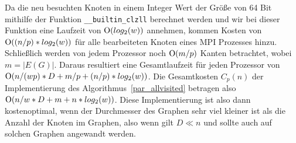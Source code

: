 \documentclass[11pt,a4paper]{article}
\begin{document}
Da die neu besuchten Knoten in einem Integer Wert der Größe von 64 Bit mithilfe der Funktion \lstinline{__builtin_clzll} berechnet werden und wir bei dieser Funktion eine Laufzeit von \($O$(log_{2}(w))\) annehmen, kommen Kosten von \($O$((n/p)*log_{2}(w))\) für alle bearbeiteten Knoten eines MPI Prozesses hinzu. Schließlich werden von jedem Prozessor noch \($O$(m/p)\) Kanten betrachtet, wobei \(m = |E(G)|\). Daraus resultiert eine Gesamtlaufzeit für jeden Prozessor von \($O$(n/(wp)*D + m/p + (n/p)*log_{2}(w))\).  Die Gesamtkosten \(C_{p}(n)\) der Implementierung des Algorithmus~\ref{par_allvisited} betragen also \($O$(n/w*D + m + n*log_{2}(w))\). Diese Implementierung ist also dann kostenoptimal, wenn der Durchmesser des Graphen sehr viel kleiner ist als die Anzahl der Knoten im Graphen, also wenn gilt \(D \ll n\) und sollte auch auf solchen Graphen angewandt werden.
\end{document}
